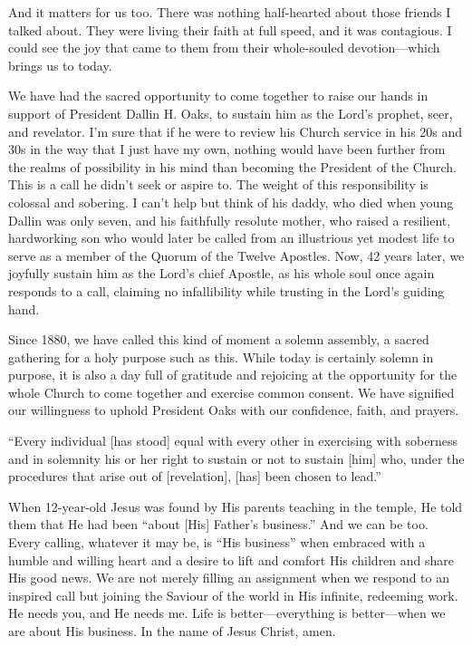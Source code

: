 \documentclass[letterpaper, 11pt]{report}
\newcommand{\intalkheader}[1]{
    \vspace{0.75em}
    \noindent{\normalsize\bfseries #1}
    \par\nopagebreak %
    \vspace{0.25em}
    \nopagebreak     %
}
\begin{document}
And it matters for us too. There was nothing half-hearted about those friends I talked about. They were living their faith at full speed, and it was contagious. I could see the joy that came to them from their whole-souled devotion—which brings us to today.

\intalkheader{Solemn Assembly}

We have had the sacred opportunity to come together to raise our hands in support of President Dallin H. Oaks, to sustain him as the Lord’s prophet, seer, and revelator. I’m sure that if he were to review his Church service in his 20s and 30s in the way that I just have my own, nothing would have been further from the realms of possibility in his mind than becoming the President of the Church. This is a call he didn’t seek or aspire to. The weight of this responsibility is colossal and sobering. I can’t help but think of his daddy, who died when young Dallin was only seven, and his faithfully resolute mother, who raised a resilient, hardworking son who would later be called from an illustrious yet modest life to serve as a member of the Quorum of the Twelve Apostles. Now, 42 years later, we joyfully sustain him as the Lord’s chief Apostle, as his whole soul once again responds to a call, claiming no infallibility while trusting in the Lord’s guiding hand.

Since 1880, we have called this kind of moment a solemn assembly, a sacred gathering for a holy purpose such as this. While today is certainly solemn in purpose, it is also a day full of gratitude and rejoicing at the opportunity for the whole Church to come together and exercise common consent. We have signified our willingness to uphold President Oaks with our confidence, faith, and prayers.

“Every individual [has stood] equal with every other in exercising with soberness and in solemnity his or her right to sustain or not to sustain [him] who, under the procedures that arise out of [revelation], [has] been chosen to lead.”

\intalkheader{About His Business}

When 12-year-old Jesus was found by His parents teaching in the temple, He told them that He had been “about [His] Father’s business.” And we can be too. Every calling, whatever it may be, is “His business” when embraced with a humble and willing heart and a desire to lift and comfort His children and share His good news. We are not merely filling an assignment when we respond to an inspired call but joining the Saviour of the world in His infinite, redeeming work. He needs you, and He needs me. Life is better—everything is better—when we are about His business. In the name of Jesus Christ, amen.
\end{document}
